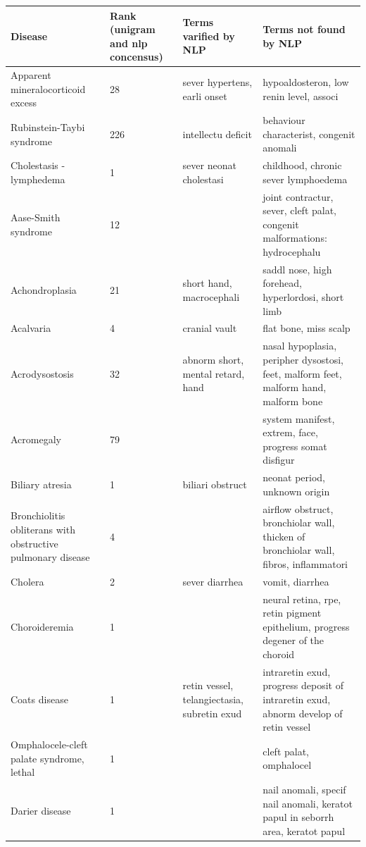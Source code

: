 \documentclass[10pt,letterpaper,final]{article}
\begin{document}
\begin{center}
\begin{small}
	\begin{longtable}{|p{3.5cm}|p{1.5cm}|p{3cm}|p{3cm}|}
	\hline
	\textbf{Disease}  & \textbf{Rank (unigram and nlp concensus)} & \textbf{Terms varified by NLP}  & \textbf{Terms not found by NLP} \\
	\hline\hline
Apparent mineralocorticoid excess & 28 & sever hypertens, earli onset & hypoaldosteron, low renin level, associ \\ \hline
Rubinstein-Taybi syndrome & 226 & intellectu deficit & behaviour characterist, congenit anomali \\ \hline
Cholestasis - lymphedema & 1 & sever neonat cholestasi &  childhood, chronic sever lymphoedema \\ \hline
Aase-Smith syndrome & 12 &   & joint contractur, sever, cleft palat, congenit malformations: hydrocephalu \\ \hline
Achondroplasia & 21 & short hand, macrocephali & saddl nose, high forehead, hyperlordosi, short limb \\ \hline
Acalvaria & 4 & cranial vault &  flat bone, miss scalp \\ \hline
Acrodysostosis & 32 & abnorm short, mental retard, hand & nasal hypoplasia, peripher dysostosi, feet, malform feet, malform hand, malform bone \\ \hline
Acromegaly & 79 &  & system manifest, extrem, face, progress somat disfigur \\ \hline
Biliary atresia & 1 & biliari obstruct &  neonat period, unknown origin \\ \hline
Bronchiolitis obliterans with obstructive pulmonary disease & 4 &  &  airflow obstruct, bronchiolar wall, thicken of bronchiolar wall, fibros, inflammatori \\ \hline
Cholera & 2 & sever diarrhea &  vomit, diarrhea  \\ \hline
Choroideremia & 1 &  &  neural retina, rpe, retin pigment epithelium, progress degener of the choroid \\ \hline
Coats disease & 1 & retin vessel, telangiectasia, subretin exud &  intraretin exud, progress deposit of intraretin exud, abnorm develop of retin vessel \\ \hline
Omphalocele-cleft palate syndrome, lethal & 1 &  &  cleft palat, omphalocel \\ \hline
Darier disease & 1 &  &  nail anomali, specif nail anomali, keratot papul in seborrh area, keratot papul \\ \hline

\end{longtable}
\end{small}
\end{center}
\end{document}
